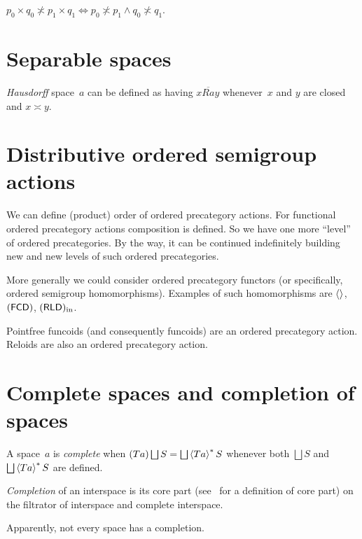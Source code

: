 \begin{thm}
$p_0\times q_0\nasymp p_1\times q_1 \Leftrightarrow p_0\nasymp p_1\land q_0\nasymp q_1$. 
\end{thm}

\chapter{Separable spaces}

\emph{Hausdorff} space~$a$ can be defined as having $x\overline{Ra}y$ whenever~$x$ and $y$ are closed and $x\asymp y$.


\chapter{Distributive ordered semigroup actions}

We can define (product) order of ordered precategory actions. For functional ordered precategory actions composition is defined. So we have one more ``level'' of ordered precategories. By the way, it can be continued indefinitely building new and new levels of such ordered precategories.

More generally we could consider ordered precategory functors (or specifically, ordered semigroup homomorphisms). Examples of such homomorphisms are $\left\langle \right\rangle$, $(\mathsf{FCD})$, $(\mathsf{RLD})_{\mathrm{in}}$.

Pointfree funcoids (and consequently funcoids) are an ordered precategory action. Reloids are also an ordered precategory action.

\chapter{Complete spaces and completion of spaces}

A space~$a$ is \emph{complete} when $(Ta)\bigsqcup S=\bigsqcup\rsupfun{Ta}S$ whenever both $\bigsqcup S$ and $\bigsqcup\rsupfun{Ta}S$ are defined.

\begin{defn}
\emph{Completion} of an interspace is its core part (see~\cite{volume-1} for a definition of core part) on the filtrator of interspace and complete interspace.
\end{defn}

\begin{note}
Apparently, not every space has a completion.
\end{note}

